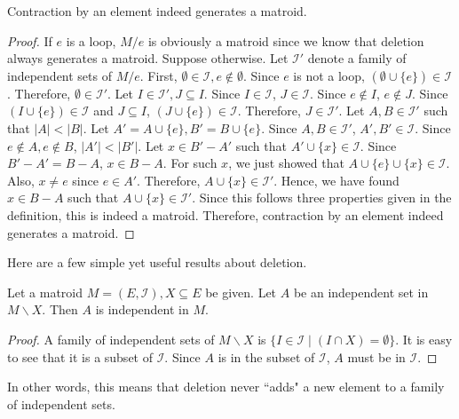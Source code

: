 \begin{thm}
Contraction by an element indeed generates a matroid.
\end{thm}

\begin{proof}
If $e$ is a loop, $M / e$ is obviously a matroid since we know that deletion always generates a matroid.
Suppose otherwise.
Let $\mathcal{I}'$ denote a family of independent sets of $M / e$.
First, $\emptyset \in \mathcal{I}, e \notin \emptyset$. Since $e$ is not a loop, $(\emptyset \cup \{ e \}) \in \mathcal{I}$.
Therefore, $\emptyset \in \mathcal{I}'$.
Let $I \in \mathcal{I}', J \subseteq I$.
Since $I \in \mathcal{I}$, $J \in \mathcal{I}$.
Since $e \notin I$, $e \notin J$.
Since $(I \cup \{ e \}) \in \mathcal{I}$ and $J \subseteq I$, $(J \cup \{ e \}) \in \mathcal{I}$.
Therefore, $J \in \mathcal{I}'$.
Let $A, B \in \mathcal{I}'$ such that $\lvert A \rvert < \lvert B \rvert$.
Let $A' = A \cup \{ e \}, B' = B \cup \{ e \}$.
Since $A, B \in \mathcal{I}'$, $A', B' \in \mathcal{I}$.
Since $e \notin A, e \notin B$, $\lvert A' \rvert < \lvert B' \rvert$.
Let $x \in B' - A'$ such that $A' \cup \{ x \} \in \mathcal{I}$.
Since $B' - A' = B - A$, $x \in B - A$.
For such $x$, we just showed that $A \cup \{ e \} \cup \{ x \} \in \mathcal{I}$.
Also, $x \neq e$ since $e \in A'$.
Therefore, $A \cup \{ x \} \in \mathcal{I}'$. 
Hence, we have found $x \in B - A$ such that $A \cup \{ x \} \in \mathcal{I}'$.
Since this follows three properties given in the definition, this is indeed a matroid.
Therefore, contraction by an element indeed generates a matroid.
\end{proof}


Here are a few simple yet useful results about deletion.

\begin{thm}
Let a matroid $M = (E, \mathcal{I}), X \subseteq E$ be given.
Let $A$ be an independent set in $M \backslash X$.
Then $A$ is independent in $M$.
\end{thm}

\begin{proof}
A family of independent sets of $M \backslash X$ is $\{ I \in \mathcal{I} \mid (I \cap X) = \emptyset \}$.
It is easy to see that it is a subset of $\mathcal{I}$.
Since $A$ is in the subset of $\mathcal{I}$, $A$ must be in $\mathcal{I}$.
\end{proof}

In other words, this means that deletion never ``adds" a new element to a family of independent sets.


